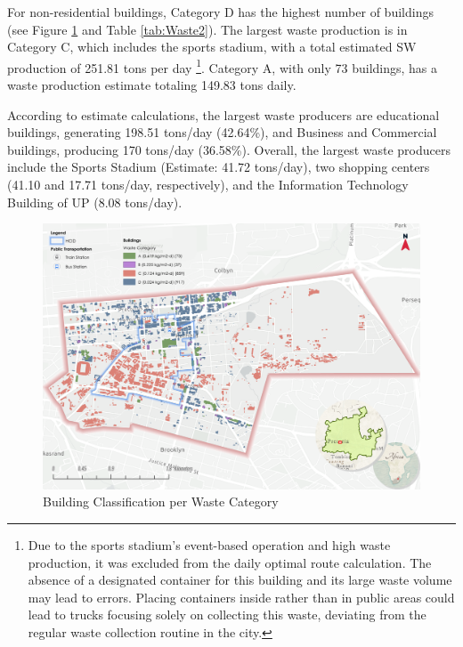 \documentclass[authoryear,preprint,review,doubleblind, 12pt]{elsarticle}
\begin{document}
    For non-residential buildings, Category D has the highest number of buildings (see Figure \ref{fig:buildWaste} and Table \ref{tab:Waste2}). The largest waste production is in Category C, which includes the sports stadium, with a total estimated SW production of 251.81 tons per day \footnote{Due to the sports stadium's event-based operation and high waste production, it was excluded from the daily optimal route calculation. The absence of a designated container for this building and its large waste volume may lead to errors. Placing containers inside rather than in public areas could lead to trucks focusing solely on collecting this waste, deviating from the regular waste collection routine in the city.}. Category A, with only 73 buildings, has a waste production estimate totaling 149.83 tons daily.

    According to estimate calculations, the largest waste producers are educational buildings, generating 198.51 tons/day (42.64\%), and Business and Commercial buildings, producing 170 tons/day (36.58\%). Overall, the largest waste producers include the Sports Stadium (Estimate: 41.72 tons/day), two shopping centers (41.10 and 17.71 tons/day, respectively), and the Information Technology Building of UP (8.08 tons/day).
    
    \begin{figure}[ht]
    \centering
    \includegraphics[width=1.2\linewidth]{Figures/Waste Categories.png}
        \caption{Building Classification per Waste Category}
        \label{fig:buildWaste}
    \end{figure}
\end{document}
